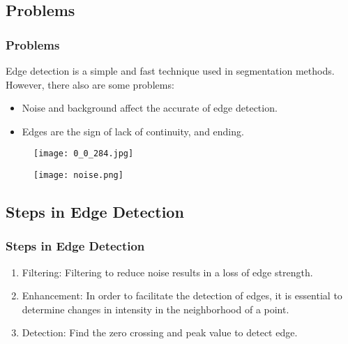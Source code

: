 \documentclass[notheorems,serif,table,compress]{beamer}  %
\begin{document}
\subsection{Problems}
\begin{frame}
\frametitle{Problems}
Edge detection is a simple and fast technique used in segmentation methods. However, there also are some problems:
    \begin{itemize}
    \item {\color{blue}Noise and background affect the accurate of edge detection.}
    \item Edges are the sign of lack of continuity, and ending.
    \end{itemize}
    \begin{figure}
    \begin{minipage}[t]{0.4\linewidth}
    \centering
    \texttt{[image: 0\_0\_284.jpg]} 
    \end{minipage}
    \begin{minipage}[t]{0.4\linewidth}
    \centering
    \texttt{[image: noise.png]} 
    \end{minipage}
    \end{figure}
\end{frame}

\subsection{Steps in Edge Detection}
\begin{frame}
\frametitle{Steps in Edge Detection}
    \begin{enumerate}
    \item {\color{blue}Filtering:} Filtering to reduce noise results in a loss of edge strength.
    \item {\color{blue}Enhancement:} In order to facilitate the detection of edges, it is essential to determine changes in intensity in the neighborhood of a point. 
    \item {\color{blue}Detection:} Find the zero crossing and peak value to detect edge.
    \end{enumerate}
\end{frame}
\end{document}
